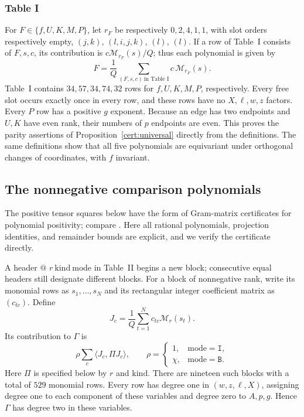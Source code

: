 \subsubsection{Table I}\label{cert:table-I}

For $F\in\{f,U,K,M,P\}$, let $r_F$ be respectively $0,2,4,1,1$, with slot
orders respectively empty, $(j,k)$, $(l,i,j,k)$, $(l)$, $(l)$.  If a row of
Table~I consists of $F,s,c$, its contribution is $c\mathcal M_{r_F}(s)/Q$;
thus each polynomial is given by
\begin{equation}\label{cert:fixed-polynomials}
 F=\frac1Q\sum_{(F,s,c)\ \text{in Table I}}c\,\mathcal M_{r_F}(s).
\end{equation}
Table~I contains $34,57,34,74,32$ rows for $f,U,K,M,P$, respectively.
Every free slot occurs exactly once in every row, and these rows have no
$X,\ell,w,z$ factors.  Every $P$ row has a positive $g$ exponent.  Because
an edge has two endpoints and $U,K$ have even rank, their numbers of $p$
endpoints are even.  This proves the parity assertions of
Proposition~\ref{cert:universal} directly from the definitions.  The same
definitions show that all five polynomials are equivariant under orthogonal
changes of coordinates, with $f$ invariant.

\subsection{The nonnegative comparison polynomials}\label{cert:gram}

The positive tensor squares below have the form of Gram-matrix
certificates for polynomial positivity; compare
\cite[Section~3.2]{Parrilo2003}. Here all rational polynomials,
projection identities, and remainder bounds are explicit, and we verify
the certificate directly.


A header $\texttt{@ }r\ \mathrm{kind}\ \mathrm{mode}$ in Table~II begins a
new block; consecutive equal headers still designate different blocks.
For a block of nonnegative rank, write its monomial rows as $s_1,\ldots,s_N$
and its rectangular integer coefficient matrix as $(c_{tc})$.  Define
\[
 J_c=\frac1Q\sum_{t=1}^N c_{tc}\mathcal M_r(s_t).
\]
Its contribution to $\Gamma$ is
\begin{equation}\label{cert:gram-block}
 \rho\sum_c\langle J_c,\Pi J_c\rangle,\qquad
 \rho=\begin{cases}1,&\mathrm{mode}=\texttt{I},\\
                    \chi,&\mathrm{mode}=\texttt{B}.
       \end{cases}
\end{equation}
Here $\Pi$ is specified below by $r$ and $\mathrm{kind}$.  There are nineteen
such blocks with a total of $529$ monomial rows.  Every row has degree one in
$(w,z,\ell,X)$, assigning degree one to each component of these variables and
degree zero to $A,p,g$.  Hence $\Gamma$ has degree two in these variables.

